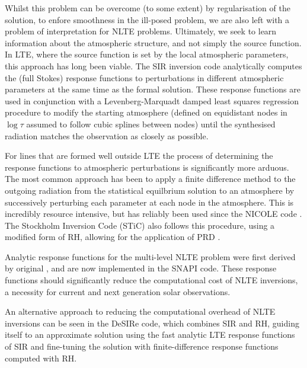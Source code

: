 Whilst this problem can be overcome (to some extent) by regularisation of the solution, to enfore smoothness in the ill-posed problem, we are also left with a problem of interpretation for NLTE problems.
Ultimately, we seek to learn information about the atmospheric structure, and not simply the source function.
In LTE, where the source function is set by the local atmospheric parameters, this approach has long been viable.
The SIR inversion code \citep{1992RuizCobo} analytically computes the (full Stokes) response functions to perturbations in different atmospheric parameters at the same time as the formal solution.
These response functions are used in conjunction with a Levenberg-Marquadt damped least squares regression procedure to modify the starting atmosphere (defined on equidistant nodes in $\log \tau$ assumed to follow cubic splines between nodes) until the synthesised radiation matches the observation as closely as possible.

For lines that are formed well outside LTE the process of determining the response functions to atmospheric perturbations is significantly more arduous.
The most common approach has been to apply a finite difference method to the outgoing radiation from the statistical equilbrium solution to an atmosphere by successively perturbing each parameter at each node in the atmosphere.
This is incredibly resource intensive, but has reliably been used since the NICOLE code \citep[first distributed 2000]{Socas-Navarro2015}.
The Stockholm Inversion Code (STiC) also follows this procedure, using a modified form of RH, allowing for the application of PRD \citep{2019dlcr}.

Analytic response functions for the multi-level NLTE problem were first derived by \NeedRef{} original \citet{Milic2018}, and are now implemented in the SNAPI code.
These response functions should significantly reduce the computational cost of NLTE inversions, a necessity for current and next generation solar observations.

An alternative approach to reducing the computational overhead of NLTE inversions can be seen in the DeSIRe code, which combines SIR and RH, guiding itself to an approximate solution using the fast analytic LTE response functions of SIR and fine-tuning the solution with finite-difference response functions computed with RH. \NeedRef{}

